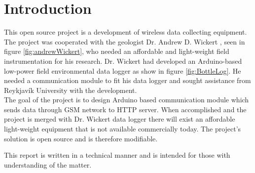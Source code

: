 \section*{Introduction}
This open source project is a development of wireless data collecting equipment. The project was cooperated with the geologist Dr. Andrew D. Wickert \cite{andrewWickert}, seen in figure \ref{fig:andrewWickert}, who needed an affordable and light-weight field instrumentation for his research. Dr. Wickert had developed an Arduino-based\cite{arduinoMega}  low-power field environmental data logger as show in figure \ref{fig:BottleLog}. He needed a communication module to fit his data logger and sought assistance from Reykjavík University with the development.\\
The goal of the project is to design Arduino based communication module which sends data through GSM network to HTTP server. When accomplished and the project is merged with Dr. Wickert data logger there will exist an affordable light-weight equipment that is not available commercially today. The project's solution is open source and is therefore modifiable.

This report is written in a technical manner and is intended for those with understanding of the matter.